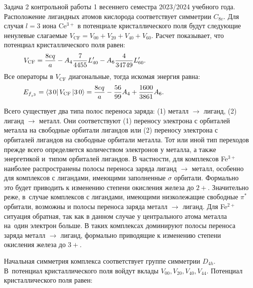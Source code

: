  Задача 2 контрольной работы 1 весеннего семестра 2023/2024 учебного года. Расположение лигандных атомов кислорода соответствует симметрии $C_{8v}$. Для случая $l=3$ иона Ce$^{3+}$ в потенциале кристаллического поля будут следующие ненулевые слагаемые $V_{\text{CF}}=V_{00}+V_{20}+V_{40}+V_{60}$. Расчет показывает, что потенциал кристаллического поля равен:
\begin{equation*}
\begin{aligned}
& V_{\text{CF}}= \dfrac{8eq}{a} - A_4 \dfrac{7}{4455}L_{40}' - A_6 \dfrac{4}{34749}L_{60}'. \hspace{40mm}
\end{aligned}
\end{equation*}
Все операторы в $V_{\text{CF}}$ диагональные, тогда искомая энергия равна:
\begin{equation*}
\begin{aligned}
& E_{f_{z^3}}=\bra{3\,0} V_{\text{CF}} \ket{3\,0} =\dfrac{8eq}{a} -  \dfrac{56}{99}A_4 + \dfrac{1600}{3861}A_6. \hspace{31mm}
\end{aligned}
\end{equation*}\par
{} Всего существует два типа полос переноса заряда: (1) металл $\rightarrow$ лиганд, (2) лиганд $\rightarrow$ металл. Они соответствуют (1) переносу электрона с орбиталей металла на свободные орбитали лигандов или (2) переносу электрона с орбиталей лигандов на свободные орбитали металла. Тот или иной тип переходов прежде всего определяется количеством электронов у металла, а также энергетикой и~типом орбиталей лигандов. В частности, для комплексов Fe$^{3+}$ наиболее распространены полосы переноса заряда лиганд $\rightarrow$ металл, особенно для комплексов с лигандами, имеющими заполненные $\sigma$ орбитали. Формально это будет приводить к изменению степени окисления железа до $2+$. Значительно реже, в~случае комплексов с лигандами, имеющими низколежащие свободные $\pi^*$ орбитали, возможны и полосы переноса заряда металл $\rightarrow$ лиганд. Для Fe$^{2+}$ ситуация обратная, так как в данном случае у центрального атома металла на~один электрон больше. В таких комплексах доминируют полосы переноса заряда металл $\rightarrow$ лиганд, формально приводящие к изменению степени окисления железа до $3+$.\par
{} Начальная симметрия комплекса соответствует группе симметрии $D_{4h}$. В~потенциал кристаллического поля войдут вклады $V_{00}\text{,}\,V_{20}\text{,}\,V_{40}\text{,}\,V_{44}$. Потенциал кристаллического поля равен:

